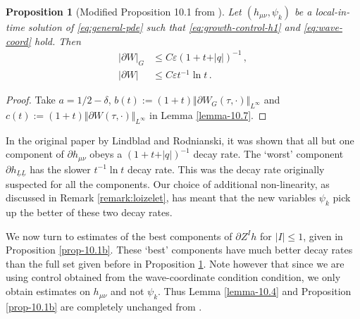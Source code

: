 \documentclass[11pt, a4paper]{amsart}
\numberwithin{equation}{section}
\newtheorem{proposition}[theorem]{Proposition}
\numberwithin{theorem}{section}
\newcommand{\p}{\partial}
\newcommand{\mn}{{\mu \nu}}
\newcommand{\lbar}{\underline{L}}
\newcommand{\qv}{\vert q \vert}
\newcommand{\I}{\vert I \vert}
\begin{document}
\begin{proposition}[Modified Proposition 10.1 from \cite{LR:04}] \label{prop-10.1a}
Let $(h_\mn, \psi_k)$ be a local-in-time solution of \eqref{eq:general-pde} such that \eqref{eq:growth-control-h1} and \eqref{eq:wave-coord} hold. Then
\begin{align*}
\vert \p W \vert_G & \leq C \varepsilon (1+t+\qv)^{-1} \,, \\
\vert \p W \vert & \leq C \varepsilon t^{-1} \ln t \,.
\end{align*}
\end{proposition}
\begin{proof}
Take $a = 1/2 - \delta$, $b(t) := (1+t) \Vert \p W_G (\tau, \cdot)  \Vert_{L^\infty}$ and $c(t) := (1+t) \Vert \p W (\tau, \cdot) \Vert _{L^\infty}$ in Lemma \ref{lemma-10.7}.
\end{proof}
In the original paper by Lindblad and Rodnianski, it was shown that all but one component of $\p h_\mn$ obeys a $(1+t+\qv)^{-1}$ decay rate. The `worst' component $\p h_{\lbar \lbar}$ has the slower $t^{-1} \ln t$ decay rate. This was the decay rate originally suspected for all the components. Our choice of additional non-linearity, as discussed in Remark \ref{remark:loizelet}, has meant that the new variables $\psi_k$ pick up the better of these two decay rates.  

We now turn to estimates of the best components of $\p Z^I h$ for $\I \leq 1$, given in Proposition \ref{prop-10.1b}. These `best' components have much better decay rates than the full set given before in Proposition \ref{prop-10.1a}. Note however that since we are using control obtained from the wave-coordinate condition condition, we only obtain estimates on $h_\mn$ and not $\psi_k$. Thus Lemma \ref{lemma-10.4} and Proposition \ref{prop-10.1b} are completely unchanged from \cite{LR:04}. 
 
\end{document}

